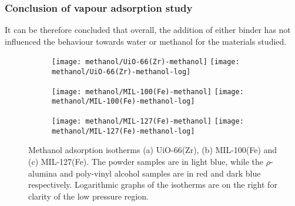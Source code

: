\subsubsection{Conclusion of vapour adsorption study}

It can be therefore concluded that overall, the addition of either 
binder has not influenced the behaviour towards water or 
methanol for the materials studied.


\begin{figure}[p!]
    \centering

    \begin{subfigure}{\linewidth}
        \centering
        \parbox{0.1\linewidth}{\caption{}\label{shaping:fgr:methanoluio66}}%
        \texttt{[image: methanol/UiO-66(Zr)-methanol]}%
        \texttt{[image: methanol/UiO-66(Zr)-methanol-log]}%
    \end{subfigure}

    \begin{subfigure}{\linewidth}
        \centering
        \parbox{0.1\linewidth}{\caption{}\label{shaping:fgr:methanolmil100}}%
        \texttt{[image: methanol/MIL-100(Fe)-methanol]}%
        \texttt{[image: methanol/MIL-100(Fe)-methanol-log]}%
    \end{subfigure}

    \begin{subfigure}{\linewidth}
        \centering
        \parbox{0.1\linewidth}{\caption{}\label{shaping:fgr:methanolmil127}}%
        \texttt{[image: methanol/MIL-127(Fe)-methanol]}%
        \texttt{[image: methanol/MIL-127(Fe)-methanol-log]}%
    \end{subfigure}
    
    \caption{Methanol adsorption isotherms (a) UiO-66(Zr), 
    (b) MIL-100(Fe) and (c) MIL-127(Fe). The powder samples are in light
    blue, while the \(\rho\)-alumina and poly-vinyl alcohol samples 
    are in red and dark blue respectively. Logarithmic graphs of
    the isotherms are
    on the right for clarity of the low
    pressure region.}%
    \label{shaping:fgr:methanoladsorption}
\end{figure}